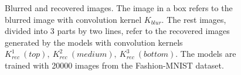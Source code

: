 \documentclass{article}
\begin{document}
\begin{figure}[!h]
\caption{Blurred and recovered images. The image in a box refers to the blurred image with convolution kernel $K_{blur}$. The rest images, divided into 3 parts by two lines, refer to the recovered images generated by the models with convolution kernels $K_{rec}^1\ (top),\ K_{rec}^2\ (medium),\ K_{rec}^3\ (bottom)$. The models are trained with 20000 images from the Fashion-MNIST dataset.}
\label{fashion_recovery}
\end{figure}
\end{document}
